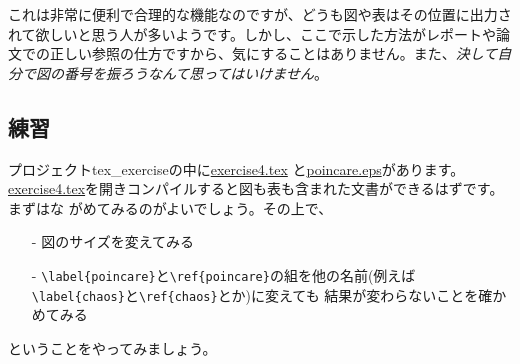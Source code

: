 これは非常に便利で合理的な機能なのですが、どうも図や表はその位置に出力さ
れて欲しいと思う人が多いようです。しかし、ここで示した方法がレポートや論
文での正しい参照の仕方ですから、気にすることはありません。また、\emph{決して自分で図の番号を振ろうなんて思ってはいけません}。

\subsection{練習}
プロジェクトtex\_exerciseの中に\underline{exercise4.tex}
と\underline{poincare.eps}があります。\underline{exercise4.tex}を開きコンパイルすると図も表も含まれた文書ができるはずです。まずはな
がめてみるのがよいでしょう。その上で、
\begin{itemize}
\item[-] 図のサイズを変えてみる
\item[-] \verb+\label{poincare}+と\verb+\ref{poincare}+の組を他の名前(例えば
	 \verb+\label{chaos}+と\verb+\ref{chaos}+とか)に変えても
	 結果が変わらないことを確かめてみる
\end{itemize}
ということをやってみましょう。\\
